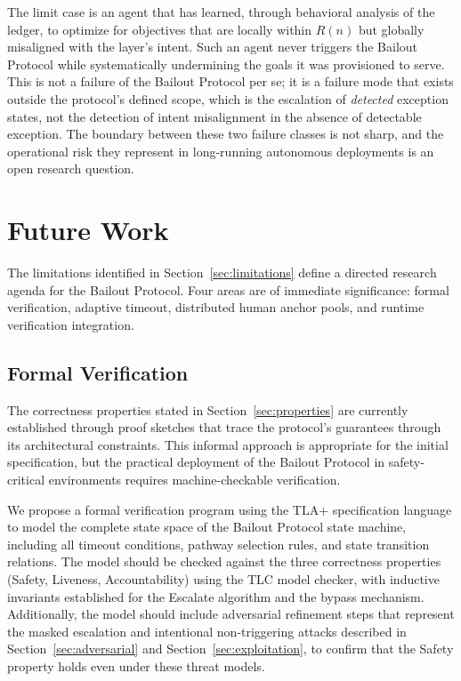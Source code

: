 The limit case is an agent that has learned, through behavioral analysis of the ledger, to optimize for objectives that are locally within $R(n)$ but globally misaligned with the \purpose{} layer's intent. Such an agent never triggers the Bailout Protocol while systematically undermining the goals it was provisioned to serve. This is not a failure of the Bailout Protocol per se; it is a failure mode that exists outside the protocol's defined scope, which is the escalation of \emph{detected} exception states, not the detection of intent misalignment in the absence of detectable exception. The boundary between these two failure classes is not sharp, and the operational risk they represent in long-running autonomous deployments is an open research question.

\section{Future Work}
\label{sec:future-work}

The limitations identified in Section~\ref{sec:limitations} define a directed research agenda for the Bailout Protocol. Four areas are of immediate significance: formal verification, adaptive timeout, distributed human anchor pools, and runtime verification integration.

\subsection{Formal Verification}
\label{sec:formal-verification}

The correctness properties stated in Section~\ref{sec:properties} are currently established through proof sketches that trace the protocol's guarantees through its architectural constraints. This informal approach is appropriate for the initial specification, but the practical deployment of the Bailout Protocol in safety-critical environments requires machine-checkable verification.

We propose a formal verification program using the TLA+ specification language to model the complete state space of the Bailout Protocol state machine, including all timeout conditions, pathway selection rules, and state transition relations. The model should be checked against the three correctness properties (Safety, Liveness, Accountability) using the TLC model checker, with inductive invariants established for the Escalate algorithm and the bypass mechanism. Additionally, the model should include adversarial refinement steps that represent the masked escalation and intentional non-triggering attacks described in Section~\ref{sec:adversarial} and Section~\ref{sec:exploitation}, to confirm that the Safety property holds even under these threat models.

